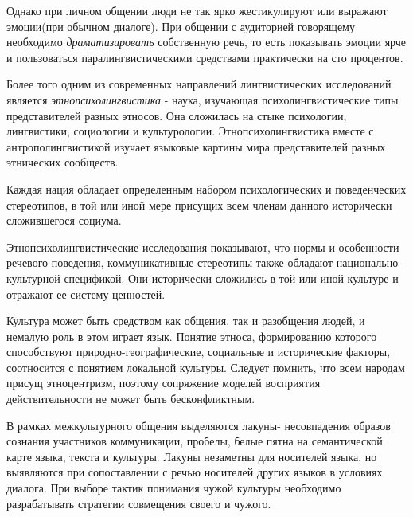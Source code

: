  Однако при личном общении люди не так ярко жестикулируют или выражают эмоции(при обычном диалоге). 
 При общении с аудиторией говорящему необходимо \textit{драматизировать} собственную речь, то есть показывать эмоции ярче и пользоваться паралингвистическими
 средствами практически на сто процентов.
 
 Более того одним из современных направлений лингвистических исследований является
 \textit{этнопсихолингвистика} - наука, изучающая психолингвистические типы представителей разных этносов. Она сложилась на стыке психологии, лингвистики, социологии и культурологии.
 Этнопсихолингвистика вместе с антрополингвистикой изучает языковые картины мира представителей разных этнических сообществ.
 
 Каждая нация обладает определенным набором психологических и поведенческих стереотипов, в той или иной мере присущих всем членам данного исторически сложившегося
 социума. 
 
 Этнопсихолингвистические исследования показывают, что нормы и особенности речевого поведения, коммуникативные стереотипы также обладают национально-культурной
 спецификой. Они исторически сложились в той или иной культуре и отражают ее систему
 ценностей.
 
 Культура может быть средством как общения, так и разобщения людей, и немалую роль в этом играет язык.
 Понятие этноса, формированию которого способствуют
 природно-географические, социальные и исторические факторы, соотносится с понятием локальной культуры. Следует помнить, что всем народам присущ этноцентризм, поэтому сопряжение моделей восприятия действительности не может быть бесконфликтным.
 
 В рамках межкультурного общения выделяются лакуны- несовпадения образов сознания участников коммуникации, пробелы, белые пятна на семантической карте языка, текста и
 культуры. Лакуны незаметны для носителей языка, но выявляются при сопоставлении с речью носителей других языков в условиях диалога. При выборе тактик понимания чужой культуры необходимо разрабатывать стратегии совмещения своего и чужого.

